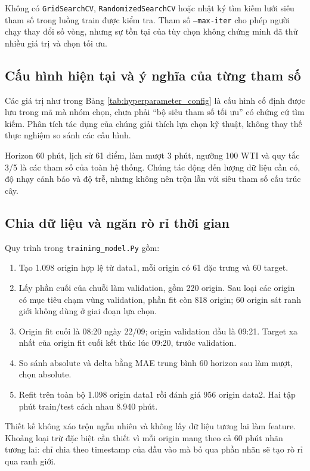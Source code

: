     Không có \texttt{GridSearchCV}, \texttt{RandomizedSearchCV} hoặc nhật ký tìm kiếm lưới siêu tham số trong luồng train được kiểm tra. Tham số \texttt{--max-iter} cho phép người chạy thay đổi số vòng, nhưng sự tồn tại của tùy chọn không chứng minh đã thử nhiều giá trị và chọn tối ưu.

    \subsection{Cấu hình hiện tại và ý nghĩa của từng tham số}

    

    Các giá trị như trong Bảng \ref{tab:hyperparameter_config} là cấu hình cố định được lưu trong mã mà nhóm chọn, chưa phải ``bộ siêu tham số tối ưu'' có chứng cứ tìm kiếm. Phân tích tác dụng của chúng giải thích lựa chọn kỹ thuật, không thay thế thực nghiệm so sánh các cấu hình.

    Horizon 60 phút, lịch sử 61 điểm, làm mượt 3 phút, ngưỡng 100 WTI và quy tắc 3/5 là các tham số của toàn hệ thống. Chúng tác động đến lượng dữ liệu cần có, độ nhạy cảnh báo và độ trễ, nhưng không nên trộn lẫn với siêu tham số cấu trúc cây.

    \subsection{Chia dữ liệu và ngăn rò rỉ thời gian}
    Quy trình trong \texttt{training\_model.Py} gồm:
    \begin{enumerate}
        \item Tạo 1.098 origin hợp lệ từ data1, mỗi origin có 61 đặc trưng và 60 target.
        \item Lấy phần cuối của chuỗi làm validation, gồm 220 origin. Sau loại các origin có mục tiêu chạm vùng validation, phần fit còn 818 origin; 60 origin sát ranh giới không dùng ở giai đoạn lựa chọn.
        \item Origin fit cuối là 08:20 ngày 22/09; origin validation đầu là 09:21. Target xa nhất của origin fit cuối kết thúc lúc 09:20, trước validation.
        \item So sánh absolute và delta bằng MAE trung bình 60 horizon sau làm mượt, chọn absolute.
        \item Refit trên toàn bộ 1.098 origin data1 rồi đánh giá 956 origin data2. Hai tập phút train/test cách nhau 8.940 phút.
    \end{enumerate}

    Thiết kế không xáo trộn ngẫu nhiên và không lấy dữ liệu tương lai làm feature. Khoảng loại trừ đặc biệt cần thiết vì mỗi origin mang theo cả 60 phút nhãn tương lai: chỉ chia theo timestamp của đầu vào mà bỏ qua phần nhãn sẽ tạo rò rỉ qua ranh giới.

